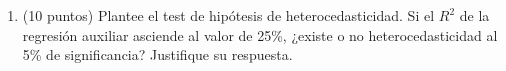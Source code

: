 \documentclass[10pt,a4paper]{article}
\begin{document}
\begin{enumerate}
\begin{enumerate}

    \item (10 puntos) Plantee el test de hipótesis de heterocedasticidad. Si el $R^2$ de la regresión auxiliar asciende al valor de 25\%, ¿existe o no heterocedasticidad al 5\% de significancia? Justifique su respuesta.\\

\end{enumerate}
\end{enumerate}
\end{document}
